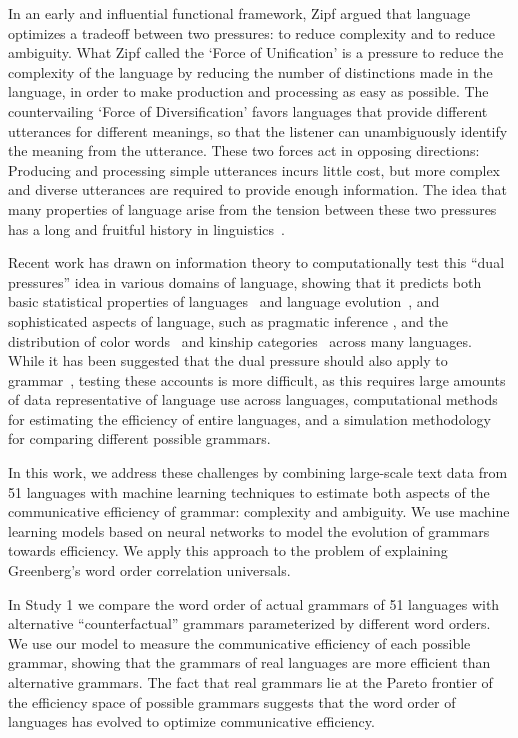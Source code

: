 \documentclass[9pt,twocolumn,twoside,lineno]{pnas-new}
\begin{document}
In an early and  influential functional framework,
Zipf \cite{zipf1949human} argued that language optimizes a tradeoff between two pressures: to reduce complexity and to reduce ambiguity.
What Zipf called the `Force of Unification' is a pressure to reduce the complexity of the language by reducing the number of distinctions made in the language, in order to make production and processing as easy as possible.
The countervailing `Force of Diversification' favors languages that provide different utterances for different meanings, so that the listener can unambiguously identify the meaning from the utterance.
These two forces act in opposing directions:
Producing and processing simple utterances incurs little cost, but more complex and diverse utterances are required to provide enough information.
The idea that many properties of language arise from the tension between these two pressures has a long and fruitful history in linguistics~\cite{gabelentz1901sprachwissenschaft,horn1984toward,lindblom1990explaining,hawkins2004efficiency,haspelmath2008functional}. %


Recent work has drawn on information theory to computationally test this ``dual pressures'' idea in various domains of language, showing that it predicts
both basic statistical properties of languages~\cite{ferreri2003least,torre2019physical} and language evolution~\cite{kirby2015compression},
and sophisticated aspects of language, such as pragmatic inference \cite{frank2012predicting}, and the distribution of color words~\cite{zaslavsky2018efficient} and kinship categories~\cite{kemp2012kinship} across many languages.
While it has been suggested that the dual pressure should also apply to grammar~\cite{hawkins2004efficiency}, testing these accounts is more difficult, as this requires large amounts of data representative of language use across languages,  computational methods for estimating the efficiency of entire languages, and a simulation methodology for comparing different possible grammars.

In this work, we address these challenges by combining large-scale text data from 51 languages with machine learning techniques to estimate both aspects of the communicative efficiency of grammar: complexity and ambiguity.
We use machine learning models based on neural networks to model the evolution of grammars towards efficiency.
We apply this approach to the problem of explaining Greenberg's word order correlation universals.

In Study 1 we compare the word order of actual grammars of 51 languages with alternative ``counterfactual'' grammars parameterized by different word orders. We use our model to measure the communicative efficiency of each possible grammar, showing  that the grammars of real languages are more efficient than alternative grammars. The fact that real grammars lie at the Pareto frontier of the efficiency space of possible grammars suggests that the word order of languages has evolved to optimize communicative efficiency.
\end{document}
